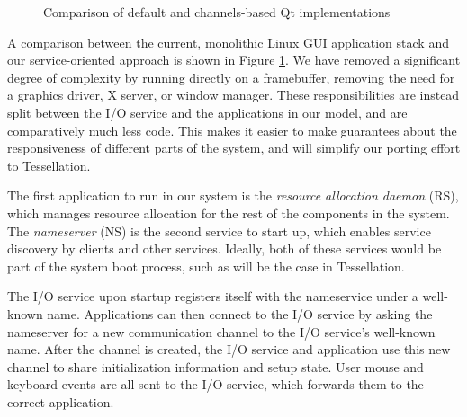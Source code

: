 \documentclass[letterpaper,twocolumn,11pt]{article}
\begin{document}
\begin{figure}[ht]
\begin{center}
  \end{center}
  \caption{Comparison of default and channels-based Qt implementations}
  \label{fig:implementation}
\end{figure}

A comparison between the current, monolithic Linux GUI application stack and our service-oriented approach is shown in Figure \ref{fig:implementation}. We have removed a significant degree of complexity by running directly on a framebuffer, removing the need for a graphics driver, X server, or window manager. These responsibilities are instead split between the I/O service and the applications in our model, and are comparatively much less code. This makes it easier to make guarantees about the responsiveness of different parts of the system, and will simplify our porting effort to Tessellation.

The first application to run in our system is the \emph{resource allocation daemon} (RS), which manages resource allocation for the rest of the components in the system. The \emph{nameserver} (NS) is the second service to start up, which enables service discovery by clients and other services. Ideally, both of these services would be part of the system boot process, such as will be the case in Tessellation.

The I/O service upon startup registers itself with the nameservice under a well-known name. Applications can then connect to the I/O service by asking the nameserver for a new communication channel to the I/O service's well-known name. After the channel is created, the I/O service and application use this new channel to share initialization information and setup state. User mouse and keyboard events are all sent to the I/O service, which forwards them to the correct application.
\end{document}
